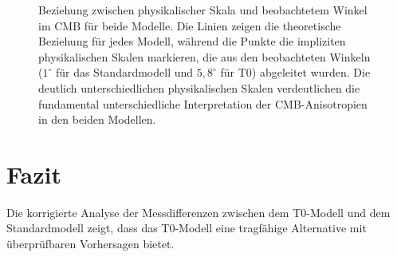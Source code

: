 \documentclass[a4paper,12pt]{article}
\newcommand{\LCDM}{\ensuremath{\Lambda}CDM}
\begin{document}
	\begin{figure}[h]
		\centering
		\caption{Beziehung zwischen physikalischer Skala und beobachtetem Winkel im CMB für beide Modelle. Die Linien zeigen die theoretische Beziehung für jedes Modell, während die Punkte die impliziten physikalischen Skalen markieren, die aus den beobachteten Winkeln ($1^\circ$ für das Standardmodell \cite{Planck2018} und $5,8^\circ$ für T0) abgeleitet wurden. Die deutlich unterschiedlichen physikalischen Skalen verdeutlichen die fundamental unterschiedliche Interpretation der CMB-Anisotropien in den beiden Modellen.}
		\label{fig:angle_scale_relationship}
	\end{figure}
	
	\section{Fazit}
	
	Die korrigierte Analyse der Messdifferenzen zwischen dem T0-Modell und dem Standardmodell \cite{Planck2018} zeigt, dass das T0-Modell eine tragfähige Alternative mit überprüfbaren Vorhersagen bietet.
	
\end{document}
